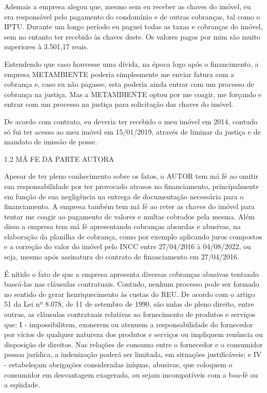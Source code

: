 \documentclass[11pt]{letter}
\begin{document}
Ademais a empresa alegou que, mesmo sem eu receber as chaves do imóvel, eu era responsável pelo pagamento do condomínio e de outras cobranças, tal como o IPTU. Durante um longo período eu paguei todas as taxas e cobranças do imóvel, sem no entanto ter recebido às chaves deste. Os valores pagos por mim são muito superiores à 3.501,17 reais.

Entendendo que caso houvesse uma dívida, na época logo após o financimento, a empresa METAMBIENTE poderia simplesmente me enviar fatura com a cobrança e, caso eu não pagasse, esta poderia ainda entrar com um processo de cobrança na justiça. Mas a METAMBIENTE optou por me coagir, me forçando e entrar com um processo na justiça para solicitação das chaves do imóvel.

De acordo com contrato, eu deveria ter recebido o meu imóvel em 2014, contudo só fui ter acesso ao meu imóvel em 15/01/2019, através de liminar da justiça e de mandato de imissão de posse. 

1.2 MÁ FE DA PARTE AUTORA

Apesar de ter pleno conhecimento sobre os fatos, o AUTOR tem má fé ao omitir sua responsabilidade por ter provocado atrasos no financiamento, principalmente em função de sua negligência na entrega de documentação necessária para o financiamento. A empresa também tem má fé ao reter as chaves do imóvel para tentar me coagir ao pagamento de valores e multas cobrados pela mesma. Além disso a empresa tem má fé apresentando cobranças absurdas e abusivas, na elaboração da planilha de cobrança, como por exemplo aplicando juros compostos e a correção do valor do imóvel pelo INCC entre 27/04/2016 à 04/08/2022, ou seja, mesmo após assinatura do contrato de financiamento em 27/04/2016.

É nítido o fato de que a empresa apresenta diversas cobranças abusivas tentando baseá-las nas cláusulas contratuais. Contudo, nenhum processo pode ser formado no sentido de gerar henriquecimento às custas do REU. De acordo com o artigo 51 da Lei nº 8.078, de 11 de setembro de 1990, são nulas de pleno direito, entre outras, as cláusulas contratuais relativas ao fornecimento de produtos e serviços que: I - impossibilitem, exonerem ou atenuem a responsabilidade do fornecedor por vícios de qualquer natureza dos produtos e serviços ou impliquem renúncia ou disposição de direitos. Nas relações de consumo entre o fornecedor e o consumidor pessoa jurídica, a indenização poderá ser limitada, em situações justificáveis; e IV - estabeleçam obrigações consideradas iníquas, abusivas, que coloquem o consumidor em desvantagem exagerada, ou sejam incompatíveis com a boa-fé ou a eqüidade. 
\end{document}
